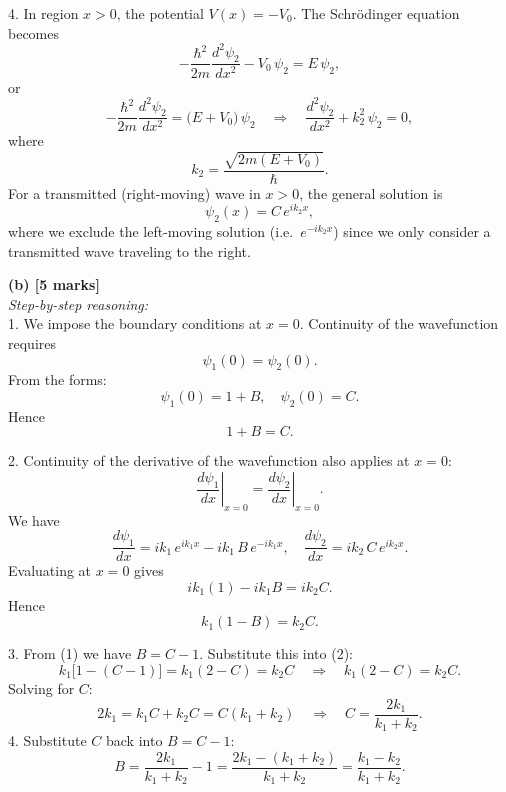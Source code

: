 \documentclass{article}
\begin{document}
4. In region \( x > 0 \), the potential \( V(x) = -V_0 \). The Schr\"odinger equation becomes
\[
-\frac{\hbar^2}{2m}\frac{d^2 \psi_2}{dx^2} - V_0 \,\psi_2 = E \,\psi_2,
\]
or
\[
-\frac{\hbar^2}{2m}\frac{d^2 \psi_2}{dx^2} = \bigl(E + V_0\bigr)\,\psi_2 \quad\Longrightarrow\quad \frac{d^2 \psi_2}{dx^2} + k_2^2\,\psi_2 = 0,
\]
where
\[
k_2 = \frac{\sqrt{2m(E + V_0)}}{\hbar}.
\]
For a transmitted (right-moving) wave in \( x>0 \), the general solution is
\[
\psi_2(x) = C\,e^{i k_2 x},
\]
where we exclude the left-moving solution (i.e.\ \( e^{-i k_2 x} \)) since we only consider a transmitted wave traveling to the right.

\textbf{(b) [5 marks]}\\
\textit{Step-by-step reasoning:}\\
1. We impose the boundary conditions at \( x = 0 \). Continuity of the wavefunction requires
\[
\psi_1(0) = \psi_2(0).
\]
From the forms:
\[
\psi_1(0) = 1 + B, \quad \psi_2(0) = C.
\]
Hence
\[
1 + B = C.
\tag{1}
\]

2. Continuity of the derivative of the wavefunction also applies at \( x = 0 \):
\[
\left.\frac{d\psi_1}{dx}\right|_{x=0} = \left.\frac{d\psi_2}{dx}\right|_{x=0}.
\]
We have
\[
\frac{d\psi_1}{dx} = i k_1 \,e^{i k_1 x} - i k_1\,B\,e^{-i k_1 x}, 
\quad
\frac{d\psi_2}{dx} = i k_2\,C\,e^{i k_2 x}.
\]
Evaluating at \( x=0 \) gives
\[
i k_1 (1) - i k_1 B = i k_2 C.
\]
Hence
\[
k_1 (1 - B) = k_2 C.
\tag{2}
\]

3. From (1) we have \( B = C - 1. \) Substitute this into (2):
\[
k_1\bigl[1 - (C - 1)\bigr] = k_1(2 - C) = k_2 C \quad\Longrightarrow\quad k_1(2 - C) = k_2 C.
\]
Solving for \( C \):
\[
2k_1 = k_1 C + k_2 C = C(k_1 + k_2) 
\quad \Longrightarrow \quad
C = \frac{2k_1}{k_1 + k_2}.
\]
4. Substitute \( C \) back into \( B = C - 1 \):
\[
B = \frac{2k_1}{k_1 + k_2} - 1 = \frac{2k_1 - (k_1 + k_2)}{k_1 + k_2} = \frac{k_1 - k_2}{k_1 + k_2}.
\]
\end{document}
